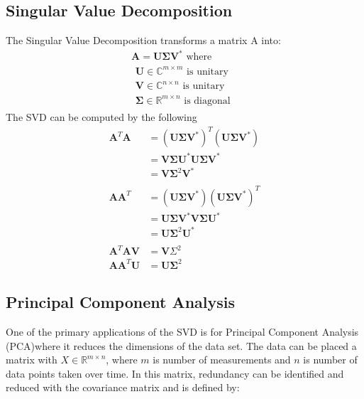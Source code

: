 \documentclass[a4paper,12pt]{article}
\begin{document}
\subsection{Singular Value Decomposition}
The Singular Value Decomposition transforms a matrix A into: 
	\begin{align*}
\mathbf { A } = \mathbf { U } \boldsymbol { \Sigma } \mathbf { V } ^ { * } \text{ where} \\
\begin{array} { l } { \mathbf { U } \in \mathbb { C } ^ { m \times m } \text { is unitary } } \\ { \mathbf { V } \in \mathbb { C } ^ { n \times n } \text { is unitary } } \\ { \boldsymbol { \Sigma } \in \mathbb { R } ^ { m \times n } \text { is diagonal } } \end{array}
	\end{align*}
	The SVD can be computed by the following
\begin{align*}
\mathbf { A } ^ { T } \mathbf { A } & = \left( \mathbf { U } \boldsymbol { \Sigma } \mathbf { V } ^ { * } \right) ^ { T } \left( \mathbf { U } \boldsymbol { \Sigma } \mathbf { V } ^ { * } \right) \\ & = \mathbf { V } \boldsymbol { \Sigma } \mathbf { U } ^ { * } \mathbf { U } \boldsymbol { \Sigma } \mathbf { V } ^ { * } \\ & = \mathbf { V } \boldsymbol { \Sigma } ^ { 2 } \mathbf { V } ^ { * }  \\ \\
\mathbf { A } \mathbf { A } ^ { T } & = \left( \mathbf { U } \boldsymbol { \Sigma } \mathbf { V } ^ { * } \right) \left( \mathbf { U } \boldsymbol { \Sigma } \mathbf { V } ^ { * } \right) ^ { T } \\ & = \mathbf { U \Sigma V } ^ { * } \mathbf { V } \boldsymbol { \Sigma } \mathbf { U } ^ { * } \\ & = \mathbf { U } \boldsymbol { \Sigma } ^ { 2 } \mathbf { U } ^ { * } \\ \\
\mathbf { A } ^ { T } \mathbf { A V } & = \mathbf { V } \Sigma ^ { 2 } \\ \mathbf { A } \mathbf { A } ^ { T } \mathbf { U } & = \mathbf { U } \boldsymbol { \Sigma } ^ { 2 }
\end{align*}
\subsection{Principal Component Analysis}
	One of the primary applications of the SVD is for Principal Component Analysis (PCA)where it reduces the dimensions of the data set.  The data can be placed a matrix with $X \in \mathbb { R } ^ { m \times n }$, where $m$ is number of measurements and $n$ is number of data points taken over time. In this matrix, redundancy can be identified and reduced with the covariance matrix and is defined by: 
 
\end{document}
